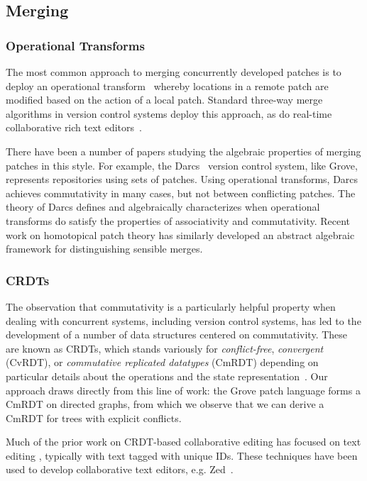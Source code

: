 \subsection{Merging}
\subsubsection{Operational Transforms}
The most common approach to merging concurrently developed patches is to deploy an operational transform~\cite{DBLP:conf/sigmod/EllisG89} whereby locations in a remote patch are modified based on the action of a local patch. Standard three-way merge algorithms in version control systems deploy this approach, as do real-time collaborative rich text editors~\cite{DBLP:journals/concurrency/IgnatAO21}. 

There have been a number of papers studying the algebraic properties of merging patches in this style. For example, the Darcs~\cite{DBLP:conf/haskell/Roundy05} version control system, like Grove, represents repositories using sets of patches. Using operational transforms, Darcs achieves commutativity in many cases, but not between conflicting patches. The theory of Darcs defines and algebraically characterizes when operational transforms do satisfy the properties of associativity and commutativity. Recent work on homotopical patch theory \cite{DBLP:journals/jfp/AngiuliMLH16} has similarly developed an abstract algebraic framework for distinguishing sensible merges. 

\subsubsection{CRDTs}

The observation that commutativity is a particularly helpful property when dealing with concurrent systems, including version control systems, has led to the development of a number of data structures centered on commutativity. These are known as CRDTs, which stands variously for \emph{conflict-free}, \emph{convergent} (CvRDT), or \emph{commutative replicated datatypes} (CmRDT) depending on particular details about the operations and the state representation~\cite{shapiro2011conflict}.
Our approach draws directly from this line of work: the Grove patch language forms a CmRDT on directed graphs, from which we observe that we can derive a CmRDT for trees with explicit conflicts.

Much of the prior work on CRDT-based collaborative editing has focused on text editing 
\cite{DBLP:conf/icdcs/PreguicaMSL09, 
DBLP:conf/cscw/OsterUMI06,
DBLP:journals/jpdc/RohJKL11,
DBLP:conf/wikis/Grishchenko10,
DBLP:conf/icdcs/WeissUM09,
DBLP:conf/doceng/NedelecMMD13,
DBLP:conf/group/NicolaescuJDK16,ahmed2011evaluating,kleppmann2020moving}, typically with text tagged with unique IDs. These techniques have been used to develop collaborative text editors, e.g. Zed~\cite{zed-blog}.

